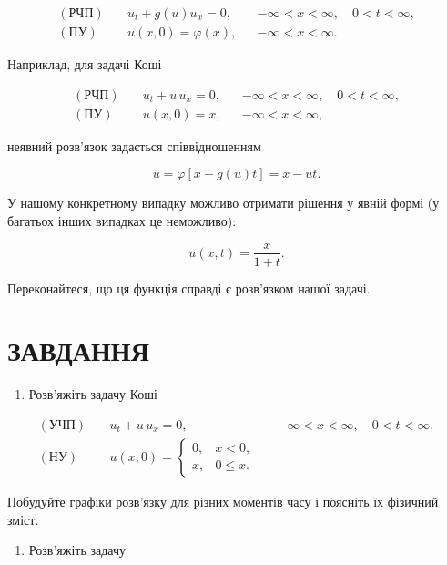 \documentclass[
  ukrainian,
]{article}
\providecommand{\tightlist}{%
  \setlength{\itemsep}{0pt}\setlength{\parskip}{0pt}}
\begin{document}
\[
\begin{aligned}
(\text{РЧП})\quad & u_t + g(u)u_x = 0, && -\infty < x < \infty,\quad 0 < t < \infty,\\
(\text{ПУ})\quad & u(x,0)=\varphi(x), && -\infty < x < \infty.
\end{aligned}
\]

Наприклад, для задачі Коші

\[
\begin{aligned}
(\text{РЧП})\quad & u_t + u\,u_x = 0, && -\infty < x < \infty,\quad 0 < t < \infty,\\
(\text{ПУ})\quad & u(x,0)=x, && -\infty < x < \infty,
\end{aligned}
\]

неявний розв'язок задається співвідношенням

\[
u=\varphi[x-g(u)t]=x-ut.
\]

У нашому конкретному випадку можливо отримати рішення у явній формі (у
багатьох інших випадках це неможливо):

\[
u(x,t)=\frac{x}{1+t}.
\]

Переконайтеся, що ця функція справді є розв'язком нашої задачі.

\section{ЗАВДАННЯ}\label{ux437ux430ux432ux434ux430ux43dux43dux44f-18}

\begin{enumerate}
\def\labelenumi{\arabic{enumi}.}
\tightlist
\item
  Розв'яжіть задачу Коші
\end{enumerate}

\[
\begin{aligned}
(\text{УЧП})\quad & u_t + u\,u_x = 0, && -\infty < x < \infty,\quad 0 < t < \infty, \\
(\text{НУ})\quad &
u(x,0)=
\begin{cases}
0, & x < 0,\\
x, & 0 \le x.
\end{cases}
\end{aligned}
\]

Побудуйте графіки розв'язку для різних моментів часу і поясніть їх
фізичний зміст.

\begin{enumerate}
\def\labelenumi{\arabic{enumi}.}
\setcounter{enumi}{1}
\tightlist
\item
  Розв'яжіть задачу
\end{enumerate}
\end{document}
